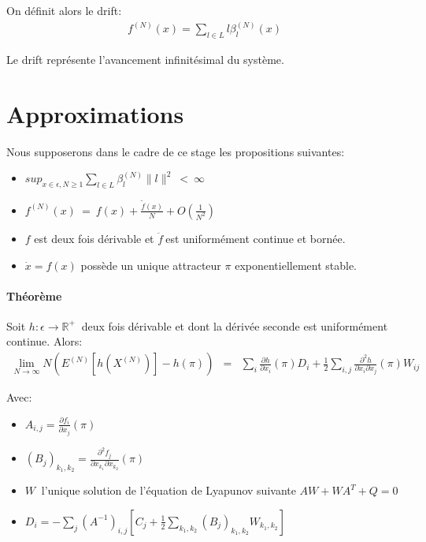 \documentclass[a4paper,12pt]{report}
\def\D{\displaystyle}
\begin{document}
On définit alors le drift:
\begin{eqnarray*}
  \D f^{(N)}(x)=\sum_{l\in L}l\beta_l^{(N)}(x)
\end{eqnarray*}

Le drift représente l'avancement infinitésimal du système. 

\section{Approximations}

Nous supposerons dans le cadre de ce stage les propositions suivantes:
\begin{itemize}
\item  $\D sup_{x\in \epsilon,N \geq 1}\sum_{l\in
    L}\beta_l^{(N)}\|l\|^2 \ < \ \infty$
\item  $\D f^{(N)}(x) \ =\  f(x)+\frac{\tilde{f}(x)}{N}+O(\frac{1}{N^2}) $
\item  $f$ est deux fois dérivable et $\D\ddot{f}\ $est uniformément continue et bornée.
\item  $\D \dot{x}=f(x)$ possède un unique attracteur $\pi$ exponentiellement stable.
\end{itemize}

\paragraph{Théorème} \cite{approx} Soit $\D h: \epsilon \rightarrow \mathbb{R}^+\ $
deux fois dérivable et dont la dérivée seconde est uniformément
continue. Alors:
\begin{eqnarray*}
  \lim_{N \rightarrow \infty}N\left(
  E^{(N)}\left[h(X^{(N)})\right]-h(\pi)\right)
  &=&
      \sum_i \frac{\partial h}{\partial x_i}(\pi)D_i + \frac{1}{2}
      \sum_{i,j} \frac{\partial^2h}{\partial x_i \partial x_j}(\pi)W_{ij}
\end{eqnarray*}

Avec:
\begin{itemize}
\item $\D A_{i,j}= \frac{\partial f_i}{\partial x_j}(\pi)$
\item $\D (B_j)_{k_1,k_2}=\frac{\partial^2f_j}{\partial
    x_{k_1} \partial x_{k_2}}(\pi)$
\item $W \ $ l'unique solution de l'équation de Lyapunov suivante $\D
  AW+WA^T+Q=0$
\item $\D D_i=-\sum_j(A^{-1})_{i,j}\left[ C_j+\frac{1}{2}\sum_{k_1,k_2}(B_j)_{k_1,k_2}W_{k_1,k_2}\right]$
\end{itemize}
\end{document}
